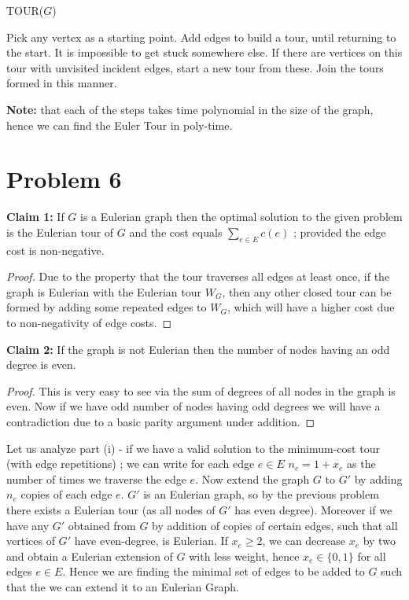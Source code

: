 \documentclass{article}
\numberwithin{equation}{section}
\begin{document}
\begin{algorithm}[H]
    \scriptsize
    \caption{TOUR($G$)}
    \begin{algorithmic}[1]
        \State Pick any vertex as a starting point. 
        \State Add edges to build a tour, until returning to the start. It is impossible to get stuck somewhere else. 
        \State If there are vertices on this tour with unvisited incident edges, start a new tour from these. 
        \State Join the tours formed in this manner. 
    \end{algorithmic}
\end{algorithm}
\noindent \textbf{Note:} that each of the steps takes time polynomial in the size of the graph, hence we can find the Euler Tour in poly-time. 
\newpage 
\section*{Problem 6}
\textbf{Claim 1: }If $G$ is a Eulerian graph then the optimal solution to the given problem is the Eulerian tour of $G$ and the cost equals $\sum_{e\in E}c(e)$ ; provided the edge cost is non-negative. 
\begin{proof}
    Due to the property that the tour traverses all edges at least once, if the graph is Eulerian with the Eulerian tour $W_G$, then any other closed tour can be formed by adding some repeated edges to $W_G$, which will have a higher cost due to non-negativity of edge costs. 
\end{proof}
\noindent \textbf{Claim 2:} If the graph is not Eulerian then the number of nodes having an odd degree is even. 
\begin{proof}
    This is very easy to see via the sum of degrees of all nodes in the graph is even. Now if we have odd number of nodes having odd degrees we will have a contradiction due to a basic parity argument under addition. 
\end{proof}
Let us analyze part (i) - if we have a valid solution to the minimum-cost tour (with edge repetitions) ; we can write for each edge $e \in E$ $n_e = 1 + x_e$ as the number of times we traverse the edge $e$. Now extend the graph $G$ to $G'$ by adding $n_e$ copies of each edge $e$. $G'$ is an Eulerian graph, so by the previous problem there exists a Eulerian tour (as all nodes of $G'$ has even degree). Moreover if we have any $G'$ obtained from $G$ by addition of copies of certain edges, such that all vertices of $G'$ have even-degree, is Eulerian. If $x_e \ge 2$, we can decrease $x_e$ by two and obtain a Eulerian extension of $G$ with less weight, hence $x_e \in \{0, 1\}$ for all edges $e \in E$. Hence we are finding the minimal set of edges to be added to $G$ such that the we can extend it to an Eulerian Graph. 
\end{document}
